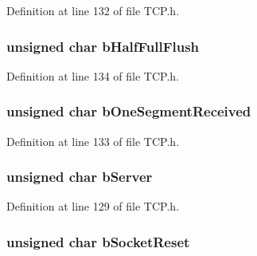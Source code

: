 Definition at line 132 of file T\+C\+P.\+h.

\hypertarget{struct_t_c_b___s_t_u_b_ae4a588e677cd61e9d1d74d0001c41c42}{}
\subsubsection[{b\+Half\+Full\+Flush}]{\setlength{\rightskip}{0pt plus 5cm}unsigned char b\+Half\+Full\+Flush}\label{struct_t_c_b___s_t_u_b_ae4a588e677cd61e9d1d74d0001c41c42}


Definition at line 134 of file T\+C\+P.\+h.

\hypertarget{struct_t_c_b___s_t_u_b_a64467e967affbc7f3bd04af24a62255f}{}
\subsubsection[{b\+One\+Segment\+Received}]{\setlength{\rightskip}{0pt plus 5cm}unsigned char b\+One\+Segment\+Received}\label{struct_t_c_b___s_t_u_b_a64467e967affbc7f3bd04af24a62255f}


Definition at line 133 of file T\+C\+P.\+h.

\hypertarget{struct_t_c_b___s_t_u_b_a820476689281baed6296b78b672c15e5}{}
\subsubsection[{b\+Server}]{\setlength{\rightskip}{0pt plus 5cm}unsigned char b\+Server}\label{struct_t_c_b___s_t_u_b_a820476689281baed6296b78b672c15e5}


Definition at line 129 of file T\+C\+P.\+h.

\hypertarget{struct_t_c_b___s_t_u_b_a02643e9de8ceb55dd2a4669b53af4ba8}{}
\subsubsection[{b\+Socket\+Reset}]{\setlength{\rightskip}{0pt plus 5cm}unsigned char b\+Socket\+Reset}\label{struct_t_c_b___s_t_u_b_a02643e9de8ceb55dd2a4669b53af4ba8}


